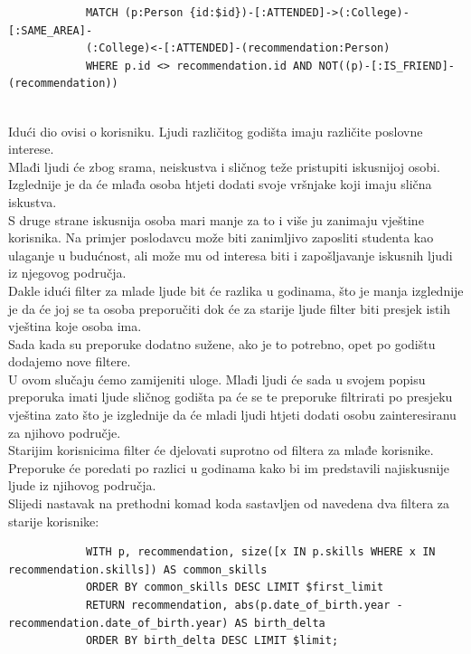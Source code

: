 \documentclass[titlepage, 12pt]{scrartcl}
\begin{document}
	\begin{samepage}
		\begin{verbatim}
			MATCH (p:Person {id:$id})-[:ATTENDED]->(:College)-[:SAME_AREA]-
			(:College)<-[:ATTENDED]-(recommendation:Person)
			WHERE p.id <> recommendation.id AND NOT((p)-[:IS_FRIEND]-(recommendation))
			
		\end{verbatim}
	\end{samepage}
	Idući dio ovisi o korisniku. Ljudi različitog godišta imaju različite poslovne interese. \\
	Mlađi ljudi će zbog srama, neiskustva i sličnog teže pristupiti  iskusnijoj osobi. Izglednije je da će mlađa osoba htjeti dodati svoje vršnjake koji imaju slična iskustva. \\
	S druge strane iskusnija osoba mari manje za to i više ju zanimaju vještine korisnika. Na primjer poslodavcu može biti zanimljivo zaposliti studenta kao ulaganje u budućnost, ali može mu od interesa biti i zapošljavanje iskusnih ljudi iz njegovog područja. \\
	Dakle idući filter za mlade ljude bit će razlika u godinama, što je manja izglednije je da će joj se ta osoba preporučiti dok će za starije ljude filter biti presjek istih vještina koje osoba ima. \\
	Sada kada su preporuke dodatno sužene, ako je to potrebno, opet po godištu dodajemo nove filtere. \\
	U ovom slučaju ćemo zamijeniti uloge. Mlađi ljudi će sada u svojem popisu preporuka imati ljude sličnog godišta pa će se te preporuke filtrirati po presjeku vještina zato što je izglednije da će mladi ljudi htjeti dodati osobu zainteresiranu za njihovo područje. \\
	Starijim korisnicima filter će djelovati suprotno od filtera za mlađe korisnike. Preporuke će poredati po razlici u godinama kako bi im predstavili najiskusnije ljude iz njihovog područja. \\
	Slijedi nastavak na prethodni komad koda sastavljen od navedena dva filtera za starije korisnike:
	\begin{samepage}
		\begin{verbatim}
			WITH p, recommendation, size([x IN p.skills WHERE x IN recommendation.skills]) AS common_skills 
			ORDER BY common_skills DESC LIMIT $first_limit
			RETURN recommendation, abs(p.date_of_birth.year - recommendation.date_of_birth.year) AS birth_delta 
			ORDER BY birth_delta DESC LIMIT $limit;
			
		\end{verbatim}
	\end{samepage}
\end{document}
